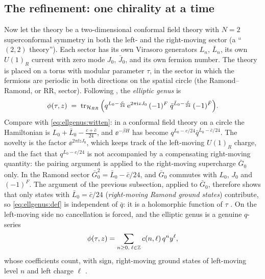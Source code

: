 \subsection{The refinement: one chirality at a time}

Now let the theory be a two-dimensional conformal field theory with $N=2$ superconformal
symmetry in both the left- and the right-moving sector (a ``$(2,2)$ theory''). Each sector
has its own Virasoro generators $L_n$, $\bar L_n$, its own $U(1)_R$ current with zero mode
$J_0$, $\bar J_0$, and its own fermion number. The theory is placed on a torus with modular
parameter $\tau$, in the sector in which the fermions are periodic in both directions on the
spatial circle (the Ramond--Ramond, or RR, sector). Following
, the \emph{elliptic genus} is
\begin{equation}\label{eq:ellgenus:def}
 \phi(\tau,z) \;=\; \operatorname{tr}_{\mathcal H_{RR}}\Big(
   q^{L_0-\frac c{24}}\,\mathrm{e}^{2\pi\mathrm{i} zJ_0}\,(-1)^F\;
   \bar q^{\bar L_0-\frac{\bar c}{24}}\,(-1)^{\bar F}\Big).
\end{equation}
Compare with \eqref{eq:ellgenus:witten}: in a conformal field theory on a circle the
Hamiltonian is $L_0+\bar L_0-\frac{c+\bar c}{24}$, and $\ee^{-\beta H}$ has become
$q^{L_0-c/24}\bar q^{\bar L_0-\bar c/24}$. The novelty is the factor $\ee^{2\pi\ii zJ_0}$,
which keeps track of the left-moving $U(1)_R$ charge, and the fact that
$q^{L_0-c/24}$ is not accompanied by a compensating right-moving quantity: the pairing
argument is applied to the right-moving supercharge $\bar G_0$ only. In the Ramond sector
$\bar G_0^2=\bar L_0-\bar c/24$, and $\bar G_0$ commutes with $L_0$, $J_0$ and $(-1)^F$. The
argument of the previous subsection, applied to $\bar G_0$, therefore shows that only states
with $\bar L_0=\bar c/24$ (\emph{right-moving Ramond ground states}) contribute, so
\eqref{eq:ellgenus:def} is independent of $\bar q$: it is a holomorphic function of $\tau$
. On the left-moving side no cancellation is forced, and the
elliptic genus is a genuine $q$-series
\begin{equation}\label{eq:ellgenus:fourier}
 \phi(\tau,z)=\sum_{n\ge0,\;\ell\in\mathbb{Z}} c(n,\ell)\,q^n y^\ell ,
\end{equation}
whose coefficients count, with sign, right-moving ground states of left-moving level $n$ and
left charge $\ell$ .

